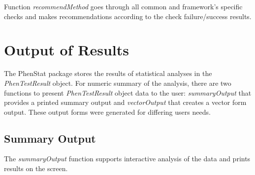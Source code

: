 \documentclass[12pt,a4paper]{article}
\begin{document}
Function \textit{recommendMethod} goes through all common and framework's specific checks and makes recommendations according to the check failure/success results.  
\section{Output of Results}
\label{section:Results}
The PhenStat package stores the results of statistical analyses in the \textit{PhenTestResult} object.  
For numeric summary of the analysis, there are two functions to present \textit{PhenTestResult} object data to the user: 
\textit{summaryOutput} that provides a printed summary output and \textit{vectorOutput} that creates a vector form output. 
These output forms were generated for differing users needs. 

\subsection{Summary Output}
\label{SummaryOutput}
The \textit{summaryOutput} function supports interactive analysis of the data and prints results on the screen.
\end{document}
